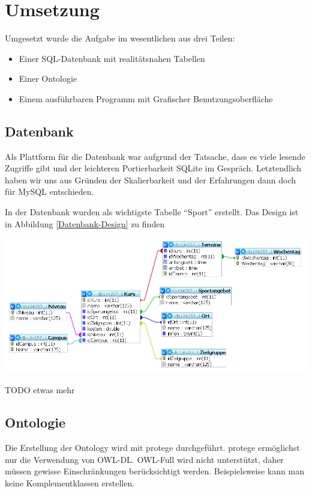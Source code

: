 \chapter{Umsetzung}

Umgesetzt wurde die Aufgabe im wesentlichen aus drei Teilen: 
\begin{itemize}
	\item Einer SQL-Datenbank mit realitätsnahen Tabellen 
	\item Einer Ontologie 
	\item Einem ausführbaren Programm mit Grafischer Benutzungsoberfläche

\end{itemize}

\section{Datenbank}

Als Plattform für die Datenbank war aufgrund der Tatsache, dass es viele lesende Zugriffe gibt und der leichteren Portierbarkeit SQLite im Gespräch. Letztendlich haben wir uns aus Gründen der Skalierbarkeit und der Erfahrungen dann doch für MySQL entschieden.

In der Datenbank wurden als wichtigste Tabelle "`Sport"' erstellt. Das Design ist in Abbildung \ref{Datenbank-Design} zu finden


\begin{capfigure}
	\includegraphics[width=150mm]{images/db_design}
\end{capfigure}

TODO etwas mehr

\section{Ontologie}
Die Erstellung der Ontology wird mit \gls{protege} durchgef\"uhrt. \gls{protege} erm\"oglichst nur die Verwendung von OWL-DL. OWL-Full wird nicht unterst\"utzt, daher m\"ussen gewisse Einschr\"ankungen ber\"ucksichtigt werden. Beispielsweise kann man keine Komplementklassen erstellen. 

